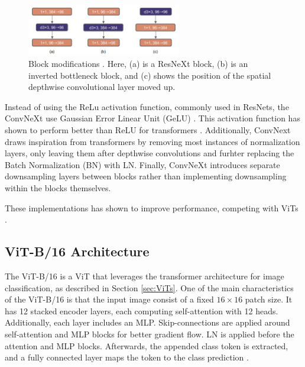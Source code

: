 \begin{figure}[h!]
    \centering
    \includegraphics[width=0.6\textwidth]{Images/convnext_block_mod.png} 
    \caption{Block modifications \cite{liu2022convnet2020s}. Here, (a) is a ResNeXt block, (b) is an inverted bottleneck block, and (c) shows the position of the spatial depthwise convolutional layer moved up.}
    \label{fig:conv_block}
\end{figure}

\noindent Instead of using the ReLu activation function, commonly used in ResNets, the ConvNeXt use Gaussian Error Linear Unit (GeLU) \cite{hendrycks2023gaussianerrorlinearunits}. This activation function has shown to perform better than ReLU for transformers \cite{liu2022convnet2020s}. Additionally, ConvNext draws inspiration from transformers by removing most instances of normalization layers, only leaving them after depthwise convolutions and furhter replacing the Batch Normalization (BN) with LN. Finally, ConvNeXt introduces separate downsampling layers between blocks rather than implementing downsampling within the blocks themselves. 

These implementations has shown to improve performance, competing with ViTs \cite{liu2022convnet2020s}.


\subsection{ViT-B/16 Architecture}
\label{sec:vitb16}
The ViT-B/16 \cite{dosovitskiy2021imageworth16x16words} is a ViT that leverages the transformer architecture for image classification, as described in Section \ref{sec:ViTs}. One of the main characteristics of the ViT-B/16 is that the input image consist of a fixed $16 \times 16$ patch size. It has 12 stacked encoder layers, each computing self-attention with 12 heads. Additionally, each layer includes an MLP. Skip-connections are applied around self-attention and MLP blocks for better gradient flow. LN is applied before the attention and MLP blocks. Afterwards, the appended class token is extracted, and a fully connected layer maps the token to the class prediction \cite{torchvision2024vitb16}. 


